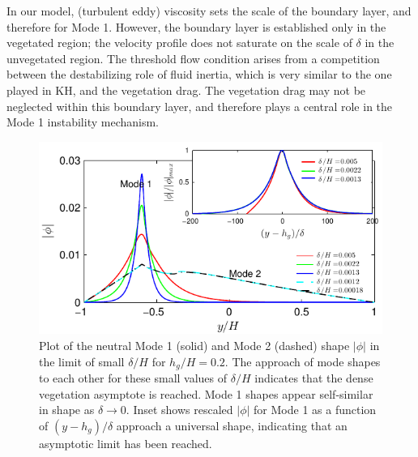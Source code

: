 \documentclass[12pt]{report}   %
\newcommand{\hg}{h_g}
\newcommand{\Rey}{{R}}
\newcommand{\Ndg}{\tilde{N}_g}
\begin{document}
In our model, (turbulent eddy) viscosity sets the scale of the boundary layer, and therefore for Mode 1.
However, the boundary layer is established only in the vegetated region; the velocity profile does not saturate on the scale of $\delta$ in the unvegetated region.
The threshold flow condition arises from a competition between the destabilizing role of fluid inertia, which is very similar to the one played in KH, and the vegetation drag.
The vegetation drag may not be neglected within this boundary layer, and therefore plays a central role in the Mode 1 instability mechanism.


\begin{figure}
\centerline{\includegraphics[scale=1.2]{Asymptotic_noshear}}
\caption{
Plot of the neutral Mode 1 (solid) and Mode 2 (dashed) shape $|\phi|$ in the limit of small $\delta/H$ for $\hg/H=0.2$. 
The approach of mode shapes to each other for these small values of $\delta/H$ indicates that the dense vegetation asymptote is reached. 
Mode 1 shapes appear self-similar in shape as $\delta\to 0$.
Inset shows rescaled $|\phi|$ for Mode 1 as a function of $(y-\hg)/\delta$ approach a universal shape, indicating that an asymptotic limit has been reached. 
}
\label{Asymptotic_mode}
\end{figure}
\end{document}
